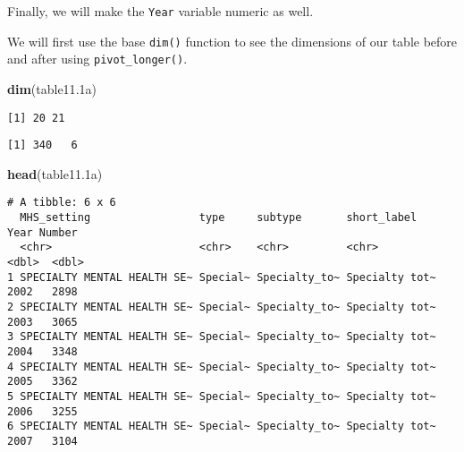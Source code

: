 \documentclass[
]{article}
\newenvironment{Shaded}{\begin{snugshade}}{\end{snugshade}}
\newcommand{\DataTypeTok}[1]{\textcolor[rgb]{0.13,0.29,0.53}{#1}}
\newcommand{\FloatTok}[1]{\textcolor[rgb]{0.00,0.00,0.81}{#1}}
\newcommand{\KeywordTok}[1]{\textcolor[rgb]{0.13,0.29,0.53}{\textbf{#1}}}
\newcommand{\NormalTok}[1]{#1}
\newcommand{\OperatorTok}[1]{\textcolor[rgb]{0.81,0.36,0.00}{\textbf{#1}}}
\newcommand{\StringTok}[1]{\textcolor[rgb]{0.31,0.60,0.02}{#1}}
\begin{document}
Finally, we will make the \texttt{Year} variable numeric as well.

We will first use the base \texttt{dim()} function to see the dimensions
of our table before and after using \texttt{pivot\_longer()}.

\begin{Shaded}
\begin{Highlighting}[]
\KeywordTok{dim}\NormalTok{(table11}\FloatTok{.1}\NormalTok{a)}
\end{Highlighting}
\end{Shaded}

\begin{verbatim}
[1] 20 21
\end{verbatim}

\begin{Shaded}
\end{Shaded}

\begin{verbatim}
[1] 340   6
\end{verbatim}

\begin{Shaded}
\begin{Highlighting}[]
\KeywordTok{head}\NormalTok{(table11}\FloatTok{.1}\NormalTok{a)}
\end{Highlighting}
\end{Shaded}

\begin{verbatim}
# A tibble: 6 x 6
  MHS_setting                 type     subtype       short_label     Year Number
  <chr>                       <chr>    <chr>         <chr>          <dbl>  <dbl>
1 SPECIALTY MENTAL HEALTH SE~ Special~ Specialty_to~ Specialty tot~  2002   2898
2 SPECIALTY MENTAL HEALTH SE~ Special~ Specialty_to~ Specialty tot~  2003   3065
3 SPECIALTY MENTAL HEALTH SE~ Special~ Specialty_to~ Specialty tot~  2004   3348
4 SPECIALTY MENTAL HEALTH SE~ Special~ Specialty_to~ Specialty tot~  2005   3362
5 SPECIALTY MENTAL HEALTH SE~ Special~ Specialty_to~ Specialty tot~  2006   3255
6 SPECIALTY MENTAL HEALTH SE~ Special~ Specialty_to~ Specialty tot~  2007   3104
\end{verbatim}
\end{document}
